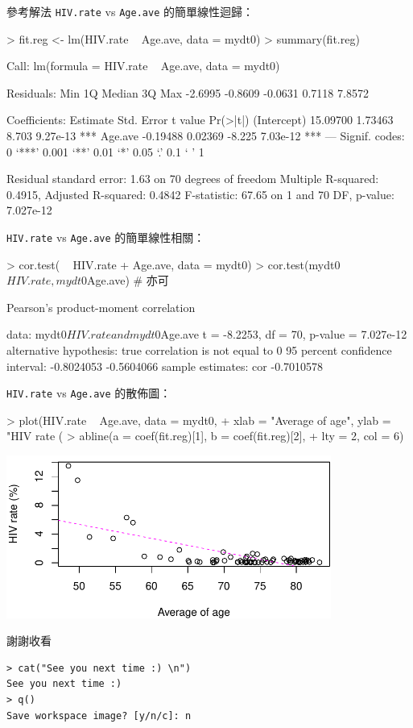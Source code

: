 \documentclass[12pt, aspectratio=43]{beamer}
\begin{document}
\begin{frame}{參考解法}
\verb+HIV.rate+ vs \verb+Age.ave+ 的簡單線性迴歸：
\begin{RC}
> fit.reg <- lm(HIV.rate ~ Age.ave, data = mydt0)
> summary(fit.reg)
\end{RC}
\begin{R}
Call:
lm(formula = HIV.rate ~ Age.ave, data = mydt0)

Residuals:
    Min      1Q  Median      3Q     Max 
-2.6995 -0.8609 -0.0631  0.7118  7.8572 

Coefficients:
            Estimate Std. Error t value Pr(>|t|)    
(Intercept) 15.09700    1.73463   8.703 9.27e-13 ***
Age.ave     -0.19488    0.02369  -8.225 7.03e-12 ***
---
Signif. codes:  0 ‘***’ 0.001 ‘**’ 0.01 ‘*’ 0.05 ‘.’ 0.1 ‘ ’ 1

Residual standard error: 1.63 on 70 degrees of freedom
Multiple R-squared:  0.4915,	Adjusted R-squared:  0.4842 
F-statistic: 67.65 on 1 and 70 DF,  p-value: 7.027e-12
\end{R}

\framebreak

\verb+HIV.rate+ vs \verb+Age.ave+ 的簡單線性相關：
\begin{RC}
> cor.test( ~ HIV.rate + Age.ave, data = mydt0)
> cor.test(mydt0$HIV.rate, mydt0$Age.ave)  # 亦可
\end{RC}
\begin{R}
	Pearson's product-moment correlation

data:  mydt0$HIV.rate and mydt0$Age.ave
t = -8.2253, df = 70, p-value = 7.027e-12
alternative hypothesis: true correlation is not equal to 0
95 percent confidence interval:
 -0.8024053 -0.5604066
sample estimates:
       cor 
-0.7010578 
\end{R}

\framebreak

\verb+HIV.rate+ vs \verb+Age.ave+ 的散佈圖：
\begin{RC}
> plot(HIV.rate ~ Age.ave, data = mydt0,
+         xlab = "Average of age", ylab = "HIV rate (%
> abline(a = coef(fit.reg)[1], b = coef(fit.reg)[2],
+        lty = 2, col = 6)
\end{RC}
\begin{center}\includegraphics[width=0.8\textwidth]{Rplot-test-lm.pdf}\end{center}

\end{frame}
\Large
\begin{frame}[fragile]{謝謝收看}
\begin{verbatim}
> cat("See you next time :) \n")
See you next time :)
> q()
Save workspace image? [y/n/c]: n
\end{verbatim}
\end{frame}
\end{document}
